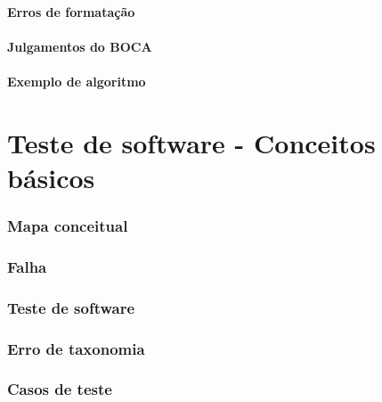 \documentclass[utf8, usepdftitle=false, svgnames, color={table,
fixpdftex, hyperref, fixinclude, xcdraw}, t, brazil]{beamer}
\begin{document}
\subsection{Erros de formatação}

 
\subsection{Julgamentos do BOCA}

 
\subsection{Exemplo de algoritmo}

 


\part{Teste de software - Conceitos básicos}
 
\section{Mapa conceitual}

 
\section{Falha}

 
\section{Teste de software}

 
\section{Erro de taxonomia}

 
\section{Casos de teste}

 
\end{document}
